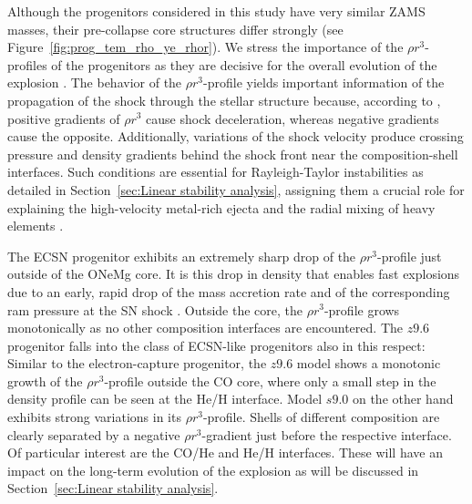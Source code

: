 \documentclass[fleqn,usenatbib]{mnras}
\newcommand{\GEO}[1]{{\color{red}#1}}
\begin{document}
Although the progenitors considered in this study have very similar ZAMS masses, their pre-collapse core structures differ strongly (see Figure~\ref{fig:prog_tem_rho_ye_rhor}).
We stress the importance of the $\rho r^3$-profiles of the progenitors as they are decisive for the overall evolution of the explosion \citep{Kifonidis2003,Wongwathanarat2015}. The behavior of the $\rho r^3$-profile yields important information of the propagation of the shock through the stellar structure because, according to \cite{Sedov1961}, positive gradients of $\rho r^3$ cause shock deceleration, whereas negative gradients cause the opposite. \GEO{Additionally, variations of the shock velocity produce crossing pressure and density gradients behind the shock front near the composition-shell interfaces. Such conditions are essential for Rayleigh-Taylor instabilities as detailed in Section~\ref{sec:Linear stability analysis}, assigning them a crucial role for explaining the high-velocity metal-rich ejecta and the radial mixing of heavy elements \citep{Wongwathanarat2015}.}

The ECSN progenitor exhibits an extremely sharp drop of the $\rho r^3$-profile just outside of the ONeMg core. It is this drop in density that enables fast explosions due to an early, rapid drop of the mass accretion rate and of the corresponding ram pressure at the SN shock \citep{Kitaura2006}. Outside the core, the $\rho r^3$-profile grows monotonically as no other composition interfaces are encountered.
The $z9.6$ progenitor falls into the class of ECSN-like progenitors also in this respect: Similar to the electron-capture progenitor, the $z9.6$ model shows a monotonic growth of the $\rho r^3$-profile outside the CO core, where only a small step in the density profile can be seen at the He/H interface.
Model $s9.0$ on the other hand exhibits strong variations in its $\rho r^3$-profile. Shells of different composition are clearly separated by a negative $\rho r^3$-gradient just before the respective interface. Of particular interest are the CO/He and He/H interfaces. These will have an impact on the long-term evolution of the explosion as will be discussed in Section~\ref{sec:Linear stability analysis}.
\end{document}

